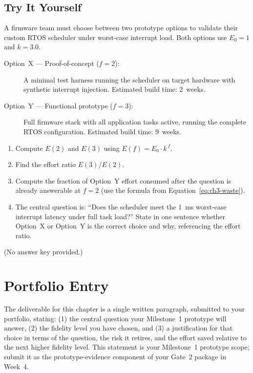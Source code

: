 \subsection*{Try It Yourself}

A firmware team must choose between two prototype options to validate
their custom RTOS scheduler under worst-case interrupt load.
Both options use $E_0 = 1$ and $k = 3.0$.

\begin{description}
  \item[Option~X --- Proof-of-concept ($f = 2$):] A minimal test harness
    running the scheduler on target hardware with synthetic interrupt
    injection. Estimated build time: 2~weeks.
  \item[Option~Y --- Functional prototype ($f = 3$):] Full firmware stack
    with all application tasks active, running the complete RTOS
    configuration. Estimated build time: 9~weeks.
\end{description}

\begin{enumerate}
  \item Compute $E(2)$ and $E(3)$ using $E(f) = E_0 \cdot k^{\,f}$.
  \item Find the effort ratio $E(3)/E(2)$.
  \item Compute the fraction of Option~Y effort consumed after the
        question is already answerable at $f=2$
        (use the formula from Equation~\ref{eq:ch3-waste}).
  \item The central question is: ``Does the scheduler meet the 1~ms
        worst-case interrupt latency under full task load?''
        State in one sentence whether Option~X or Option~Y is the correct
        choice and why, referencing the effort ratio.
\end{enumerate}

\noindent(No answer key provided.)

\section*{Portfolio Entry}
\label{sec:ch3-artifact}

The deliverable for this chapter is a single written paragraph, submitted
to your portfolio, stating: (1) the central question your Milestone~1
prototype will answer, (2) the fidelity level you have chosen, and (3) a
justification for that choice in terms of the question, the risk it retires,
and the effort saved relative to the next higher fidelity level.
This statement is your Milestone~1 prototype scope; submit it as the
prototype-evidence component of your Gate~2 package in Week~4.

